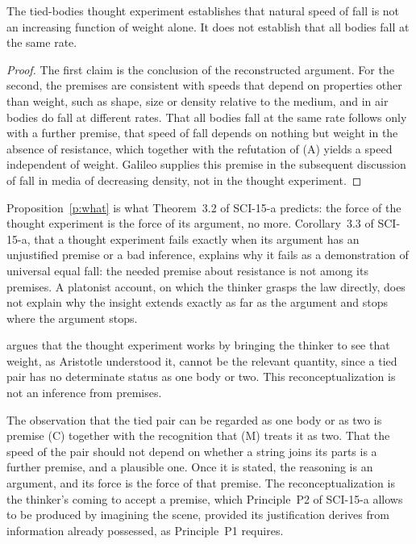 \documentclass{situationist-preprint}
\begin{document}
\begin{proposition}\label{p:what}
The tied-bodies thought experiment establishes that natural speed of fall is not an increasing function of weight alone. It does not establish that all bodies fall at the same rate.
\end{proposition}

\begin{proof}
The first claim is the conclusion of the reconstructed argument. For the second, the premises are consistent with speeds that depend on properties other than weight, such as shape, size or density relative to the medium, and in air bodies do fall at different rates. That all bodies fall at the same rate follows only with a further premise, that speed of fall depends on nothing but weight in the absence of resistance, which together with the refutation of (A) yields a speed independent of weight. Galileo supplies this premise in the subsequent discussion of fall in media of decreasing density, not in the thought experiment.
\end{proof}

Proposition~\ref{p:what} is what Theorem~3.2 of SCI-15-a predicts: the force of the thought experiment is the force of its argument, no more. Corollary~3.3 of SCI-15-a, that a thought experiment fails exactly when its argument has an unjustified premise or a bad inference, explains why it fails as a demonstration of universal equal fall: the needed premise about resistance is not among its premises. A platonist account, on which the thinker grasps the law directly, does not explain why the insight extends exactly as far as the argument and stops where the argument stops.

\begin{objection}
\citet{Gendler1998} argues that the thought experiment works by bringing the thinker to see that weight, as Aristotle understood it, cannot be the relevant quantity, since a tied pair has no determinate status as one body or two. This reconceptualization is not an inference from premises.
\end{objection}

\begin{reply}
The observation that the tied pair can be regarded as one body or as two is premise (C) together with the recognition that (M) treats it as two. That the speed of the pair should not depend on whether a string joins its parts is a further premise, and a plausible one. Once it is stated, the reasoning is an argument, and its force is the force of that premise. The reconceptualization is the thinker's coming to accept a premise, which Principle~P2 of SCI-15-a allows to be produced by imagining the scene, provided its justification derives from information already possessed, as Principle~P1 requires.
\end{reply}
\end{document}
